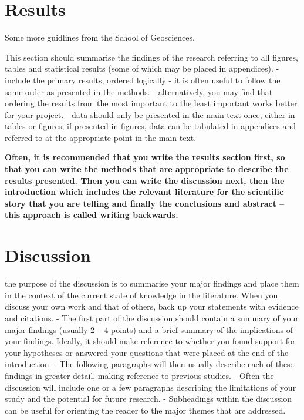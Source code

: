 \documentclass[
  11pt,
]{article}
\begin{document}
\newpage

\hypertarget{results}{%
\section{Results}\label{results}}

Some more guidlines from the School of Geosciences.

This section should summarise the findings of the research referring to
all figures, tables and statistical results (some of which may be placed
in appendices). - include the primary results, ordered logically - it is
often useful to follow the same order as presented in the methods. -
alternatively, you may find that ordering the results from the most
important to the least important works better for your project. - data
should only be presented in the main text once, either in tables or
figures; if presented in figures, data can be tabulated in appendices
and referred to at the appropriate point in the main text.

\textbf{Often, it is recommended that you write the results section
first, so that you can write the methods that are appropriate to
describe the results presented. Then you can write the discussion next,
then the introduction which includes the relevant literature for the
scientific story that you are telling and finally the conclusions and
abstract -- this approach is called writing backwards.}

\newpage

\hypertarget{discussion}{%
\section{Discussion}\label{discussion}}

the purpose of the discussion is to summarise your major findings and
place them in the context of the current state of knowledge in the
literature. When you discuss your own work and that of others, back up
your statements with evidence and citations. - The first part of the
discussion should contain a summary of your major findings (usually 2 --
4 points) and a brief summary of the implications of your findings.
Ideally, it should make reference to whether you found support for your
hypotheses or answered your questions that were placed at the end of the
introduction. - The following paragraphs will then usually describe each
of these findings in greater detail, making reference to previous
studies. - Often the discussion will include one or a few paragraphs
describing the limitations of your study and the potential for future
research. - Subheadings within the discussion can be useful for
orienting the reader to the major themes that are addressed.
\end{document}
